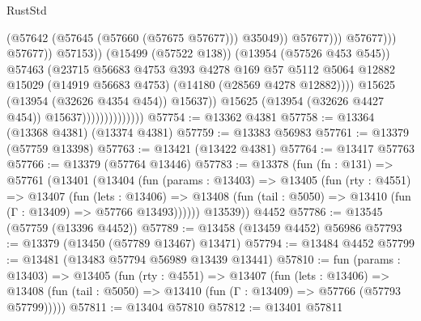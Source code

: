 \begin{lexlean}{RustStd}
\begin{coremodule}
                                                            (@57642
                                                              (@57645 (@57660 (@57675 @57677)))
                                                              @35049))
                                                          @57677)))
                                                    @57677)))
                                              @57677))
                                          @57153))
                                      (@15499 (@57522 @138))
                                      (@13954 (@57526 @453 @545))
                                      @57463
                                      (@23715
                                        @56683
                                        @4753
                                        @393
                                        @4278
                                        @169
                                        @57
                                        @5112
                                        @5064
                                        @12882
                                        @15029
                                        (@14919 @56683 @4753)
                                        (@14180 (@28569 @4278 @12882))))
                                    @15625
                                    (@13954 (@32626 @4354 @454))
                                    @15637))
                                @15625
                                (@13954 (@32626 @4427 @454))
                                @15637))))))))))))))
@57754 := @13362 @4381
@57758 := @13364 (@13368 @4381) (@13374 @4381)
@57759 := @13383 @56983
@57761 := @13379 (@57759 @13398)
@57763 := @13421 (@13422 @4381)
@57764 := @13417 @57763
@57766 := @13379 (@57764 @13446)
@57783 := @13378
    (fun (fn : @131) =>
    @57761
      (@13401
        (@13404
          (fun (params : @13403) =>
          @13405
            (fun (rty : @4551) =>
            @13407
              (fun (lets : @13406) =>
              @13408 (fun (tail : @5050) => @13410 (fun (Γ : @13409) => @57766 @13493))))))
        @13539))
    @4452
@57786 := @13545 (@57759 (@13396 @4452))
@57789 := @13458 (@13459 @4452) @56986
@57793 := @13379 (@13450 (@57789 @13467) @13471)
@57794 := @13484 @4452
@57799 := @13481 (@13483 @57794 @56989 @13439 @13441)
@57810 := fun (params : @13403) =>
  @13405
    (fun (rty : @4551) =>
    @13407
      (fun (lets : @13406) =>
      @13408 (fun (tail : @5050) => @13410 (fun (Γ : @13409) => @57766 (@57793 @57799)))))
@57811 := @13404 @57810
@57812 := @13401 @57811

\end{coremodule}
\end{lexlean}
